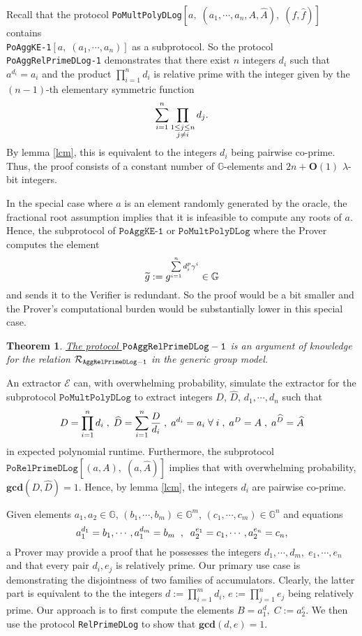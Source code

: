 \documentclass[11pt, lettersize, notitlepage, leqno, footskip=0.6cm]{article}
\newcommand{\pl}{\prod\limits}
\newcommand{\slim}{\sum\limits}
\newcommand{\ttt}{\texttt}
\newcommand{\bG}{\mathbb{G}}
\newcommand{\wti}{\widetilde}
\newcommand{\mc}{\mathcal}
\newcommand{\mb}{\mathbb}
\newcommand{\mbf}{\mathbf}
\newcommand{\lam}{\lambda}
\newcommand{\what}{\widehat}
\newcommand{\bO}{\mbf{O}}
\newcommand{\vs}{\vspace{-0.15cm}}
\newcommand{\noin}{\noindent}
\newcommand{\op}{overwhelming probability}
\newcommand{\GCD}{\mbf{gcd}}
\newcommand{\E}{\mc{E}}
\newtheorem{Thm}{Theorem}[section]
\numberwithin{equation}{section}
\begin{document}
Recall that the protocol \verb|PoMultPolyDLog|$[a,\;(a_1,\cdots,a_n,A, \what{A}),\; (f,\what{f})]$  contains\\ \verb|PoAggKE-1|$[a,\;(a_1,\cdots,a_n)]$ as a subprotocol. So the protocol \verb|PoAggRelPrimeDLog-1| demonstrates that there exist $n$ integers $d_i$ such that $a^{d_i} = a_i$ and the product $\prod_{i=1}^n d_i$ is relative prime with the integer given by the $(n-1)$-th elementary symmetric function \vs $$\slim_{i=1}^n \pl_{\substack{1\leq j\leq n \\ j\neq i}} d_j. \vs $$ By lemma \ref{lcm}, this is equivalent to the integers $d_i$ being pairwise co-prime. Thus, the proof consists of a constant number of $\mb{G}$-elements and $2n+\bO(1)$ $\lam$-bit integers. 

In the special case where $a$ is an element randomly generated by the oracle, the fractional root assumption implies that it is infeasible to compute any roots of $a$. Hence, the subprotocol of $\ttt{PoAggKE-1}$ or $\ttt{PoMultPolyDLog}$ where the Prover computes the element \vs $$\wti{g}:= g^{\slim_{i=1}^n d_i^{p}\gamma^i}\in \bG\vs $$ and sends it to the Verifier is redundant. So the proof would be a bit smaller and the Prover's computational burden would be substantially lower in this special case. \vspace{0.2cm}

\begin{Thm} \hyperlink{RP1}{The protocol $\tt{PoAggRelPrimeDLog}-1$} is an argument of knowledge for the relation $\mc{R}_{\tt{AggRelPrimeDLog-1}}$ in the generic group model.\end{Thm}

\begin{prf} An extractor $\E$ can, with \op, simulate the extractor for the\\ subprotocol $\ttt{PoMultPolyDLog}$ to extract integers $D$, $\what{D}$, $d_1,\cdots,d_n$ such that \vs $$D = \pl_{i=1}^n d_i\;,\;\what{D} = \slim_{i=1}^n \frac{D}{d_i}   \;,\;a^{d_i} = a_i\;\forall\;i \;,\;a^{D} = A\;,\; a^{\what{D}} = \what{A}\vs $$ in expected polynomial runtime. Furthermore, the subprotocol $\ttt{PoRelPrimeDLog}[(a,A),\;(a,\what{A})]$ implies that with \op, $\GCD(D,\what{D}) = 1$. Hence, by lemma \ref{lcm}, the integers $d_i$ are pairwise co-prime.\end{prf}



\bigskip

\noin Given elements $a_1, a_2\in \mb{G}$, $(b_1,\cdots,b_m)\in\bG^m$, $(c_1,\cdots,c_m)\in\bG^n$ and equations \vs $$a_1^{d_1} = b_1,\cdots, a_1^{d_m}= b_m\;\;,\;\; a_2^{e_1} = c_1,\cdots, a_2^{e_n} = c_n, \vs$$ a Prover may provide a proof that he possesses the integers $d_1,\cdots, d_m,\;e_1,\cdots, e_n$ and that every pair $d_i, e_j$ is relatively prime. Our primary use case is demonstrating the disjointness of two families of accumulators. Clearly, the latter part is equivalent to the the integers $d:=\prod_{i=1}^m d_i$, $e:=\prod_{j=1}^n e_j$ being relatively prime. Our approach is to first compute the elements $B = a_1^d,\;C:= a_2^{e}$. We then  use the protocol \verb|RelPrimeDLog| to show that $\GCD(d, e) = 1$. 
\end{document}
